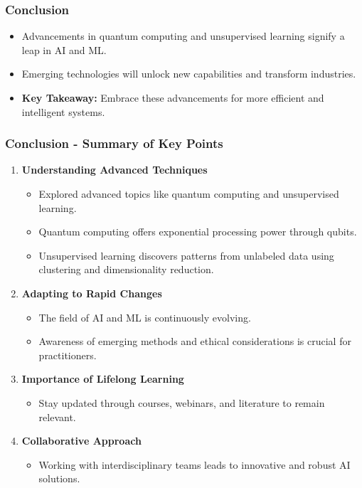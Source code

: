 \documentclass[aspectratio=169]{beamer}
\begin{document}
\begin{frame}[fragile]
    \frametitle{Conclusion}
    \begin{itemize}
        \item Advancements in quantum computing and unsupervised learning signify a leap in AI and ML.
        \item Emerging technologies will unlock new capabilities and transform industries.
        \item \textbf{Key Takeaway:} Embrace these advancements for more efficient and intelligent systems.
    \end{itemize}
\end{frame}

\begin{frame}[fragile]
    \frametitle{Conclusion - Summary of Key Points}
    \begin{enumerate}
        \item \textbf{Understanding Advanced Techniques}
        \begin{itemize}
            \item Explored advanced topics like quantum computing and unsupervised learning.
            \item Quantum computing offers exponential processing power through qubits.
            \item Unsupervised learning discovers patterns from unlabeled data using clustering and dimensionality reduction.
        \end{itemize}
        
        \item \textbf{Adapting to Rapid Changes}
        \begin{itemize}
            \item The field of AI and ML is continuously evolving.
            \item Awareness of emerging methods and ethical considerations is crucial for practitioners.
        \end{itemize}
        
        \item \textbf{Importance of Lifelong Learning}
        \begin{itemize}
            \item Stay updated through courses, webinars, and literature to remain relevant.
        \end{itemize}
        
        \item \textbf{Collaborative Approach}
        \begin{itemize}
            \item Working with interdisciplinary teams leads to innovative and robust AI solutions.
        \end{itemize}
        

\end{enumerate}
\end{frame}
\end{document}
